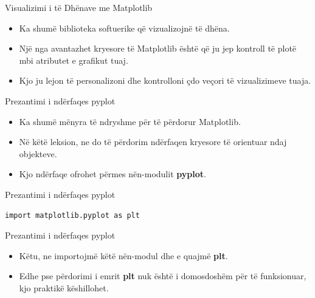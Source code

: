 \documentclass[
  ignorenonframetext,
]{beamer}
\begin{document}
\begin{frame}{Visualizimi i të Dhënave me Matplotlib}
\protect\hypertarget{visualizimi-i-tuxeb-dhuxebnave-me-matplotlib-3}{}
\begin{itemize}
\item
  Ka shumë biblioteka softuerike që vizualizojnë të dhëna.
\item
  Një nga avantazhet kryesore të Matplotlib është që ju jep kontroll të
  plotë mbi atributet e grafikut tuaj.
\item
  Kjo ju lejon të personalizoni dhe kontrolloni çdo veçori të
  vizualizimeve tuaja.
\end{itemize}
\end{frame}

\begin{frame}{Prezantimi i ndërfaqes pyplot}
\protect\hypertarget{prezantimi-i-nduxebrfaqes-pyplot}{}
\begin{itemize}
\item
  Ka shumë mënyra të ndryshme për të përdorur Matplotlib.
\item
  Në këtë leksion, ne do të përdorim ndërfaqen kryesore të orientuar
  ndaj objekteve.
\item
  Kjo ndërfaqe ofrohet përmes nën-modulit \textbf{pyplot}.
\end{itemize}
\end{frame}

\begin{frame}[fragile]{Prezantimi i ndërfaqes pyplot}
\protect\hypertarget{prezantimi-i-nduxebrfaqes-pyplot-1}{}
\begin{verbatim}
import matplotlib.pyplot as plt
\end{verbatim}
\end{frame}

\begin{frame}{Prezantimi i ndërfaqes pyplot}
\protect\hypertarget{prezantimi-i-nduxebrfaqes-pyplot-2}{}
\begin{itemize}
\item
  Këtu, ne importojmë këtë nën-modul dhe e quajmë \textbf{plt}.
\item
  Edhe pse përdorimi i emrit \textbf{plt} nuk është i domosdoshëm për të
  funksionuar, kjo praktikë këshillohet.
\end{itemize}
\end{frame}
\end{document}

